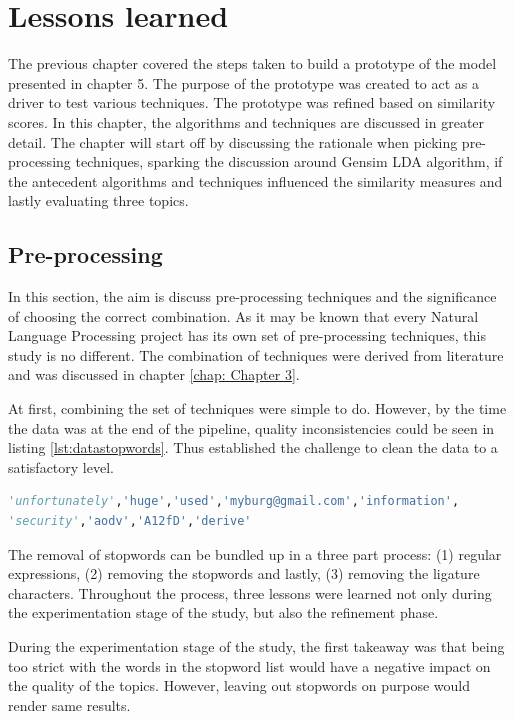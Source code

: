 \chapter{Lessons learned}
\label{chap: Chapter 7}

The previous chapter covered the steps taken to build a prototype of the model presented in chapter 5. The purpose of the prototype was created to act as a driver to test various techniques. The prototype was refined based on similarity scores.
In this chapter, the algorithms and techniques are discussed in greater detail. The chapter will start off by discussing the rationale when picking pre-processing techniques, sparking the discussion around Gensim LDA algorithm, if the antecedent algorithms and techniques influenced the similarity measures and lastly evaluating three topics. 

\section{Pre-processing}
In this section, the aim is discuss pre-processing techniques and the significance of choosing the correct combination. As it may be known that every Natural Language Processing project has its own set of pre-processing techniques, this study is no different. The combination of techniques were derived from literature and was discussed in chapter \ref{chap: Chapter 3}. 

At first, combining the set of techniques were simple to do. However, by the time the data was at the end of the pipeline, quality inconsistencies could be seen in listing \ref{lst:datastopwords}. Thus established the challenge to clean the data to a satisfactory level. 

\begin{lstlisting}[language=Python, label={lst:datastopwords}, caption=Custom list of stopwords]
'unfortunately','huge','used','myburg@gmail.com','information',
'security','aodv','A12fD','derive'
\end{lstlisting}

The removal of stopwords can be bundled up in a three part process: (1) regular expressions, (2) removing the stopwords and lastly, (3) removing the ligature characters. Throughout the process, three lessons were learned not only during the experimentation stage of the study, but also the refinement phase.

During the experimentation stage of the study, the first takeaway was that being too strict with the words in the stopword list would have a negative impact on the quality of the topics. However, leaving out stopwords on purpose would render same results. 

